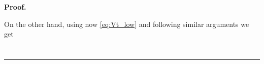 \documentclass{tufte-handout}
\newcommand{\E}{\mathbb{E}} %
\newcommand{\R}{\mathbb{R}} %
\newcommand{\dif}{\mathrm{d}}
\newenvironment{pf}[1][Proof]{\textbf{#1.} }{\ \rule{0.5em}{0.5em}}
\begin{document}
\begin{pf}
		
		
		On the other hand, using now \eqref{eq:Vt_low} and following similar arguments we get
		\begin{align*}

\end{align*}
\end{pf}
\end{document}
